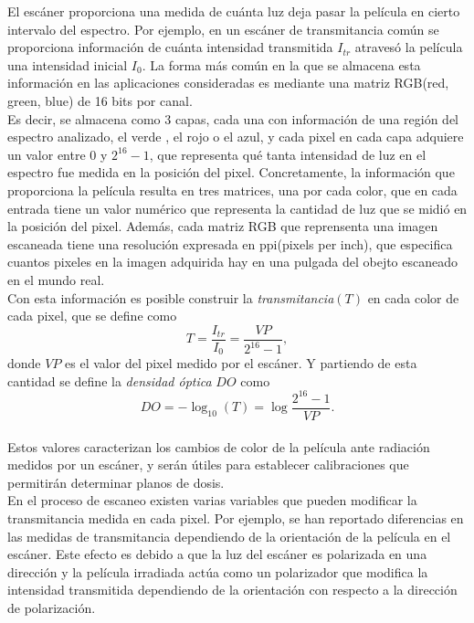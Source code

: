 El escáner proporciona una medida de cuánta luz deja pasar la película en cierto intervalo del espectro. Por ejemplo, en un escáner de transmitancia común  se proporciona información de cuánta intensidad transmitida $I_{tr}$ atravesó la película una intensidad inicial $I_0$. La forma más común en la que se almacena esta información en las aplicaciones consideradas es mediante una matriz RGB(red, green, blue) de 16 bits por canal. \\

Es decir, se almacena como 3 capas, cada una con información de una región del espectro analizado, el verde , el rojo o el azul, y cada pixel en cada capa adquiere un valor entre $0$ y $2^{16}-1$, que representa qué tanta intensidad de luz en el espectro fue medida en la posición del pixel. Concretamente, la información que proporciona la película resulta en tres matrices, una por cada color, que en cada entrada tiene un valor numérico que representa la cantidad de luz que se midió en la posición del pixel. Además, cada matriz RGB que reprensenta una imagen escaneada tiene una resolución expresada en ppi(pixels per inch), que especifica cuantos pixeles en la imagen adquirida hay en una pulgada del obejto escaneado en el mundo real.\\

Con esta información es posible construir la \textit{transmitancia}$(T)$ en cada color de cada pixel, que se define como 
\begin{equation}
	T=\frac{I_{tr}}{I_0}=\frac{VP}{2^{16}-1},
\end{equation}
donde $VP$ es el valor del pixel medido por el escáner. Y partiendo de esta cantidad se define la \textit{densidad óptica} $DO$ como 
\begin{equation}
	DO=-\log_{10}(T)=\log \frac{2^{16}-1}{VP}.
\end{equation}\\

Estos valores caracterizan los cambios de color de la película ante radiación medidos por un escáner, y serán útiles para establecer calibraciones que permitirán determinar planos de dosis.\\

En el proceso de escaneo existen varias variables que pueden modificar la transmitancia medida en cada pixel. Por ejemplo, se han reportado diferencias en las medidas de transmitancia dependiendo de la orientación de la película en el escáner\cite{mayers}. Este efecto es debido a que la luz del escáner es polarizada en una dirección y la película irradiada actúa como un polarizador que modifica la intensidad transmitida dependiendo de la orientación con respecto a la dirección de polarización.\\

